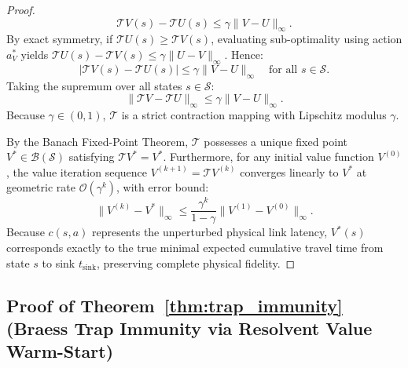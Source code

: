 \documentclass[11pt,a4paper]{article}
\begin{document}
\begin{proof}
\begin{equation}
\mathcal{T} V(s) - \mathcal{T} U(s) \le \gamma \|V - U\|_\infty.
\end{equation}
By exact symmetry, if $\mathcal{T} U(s) \ge \mathcal{T} V(s)$, evaluating sub-optimality using action $a_V^*$ yields $\mathcal{T} U(s) - \mathcal{T} V(s) \le \gamma \|U - V\|_\infty$. Hence:
\begin{equation}
\left| \mathcal{T} V(s) - \mathcal{T} U(s) \right| \le \gamma \|V - U\|_\infty \quad \text{for all } s \in \mathcal{S}.
\end{equation}
Taking the supremum over all states $s \in \mathcal{S}$:
\begin{equation}
\|\mathcal{T} V - \mathcal{T} U\|_\infty \le \gamma \|V - U\|_\infty.
\end{equation}
Because $\gamma \in (0, 1)$, $\mathcal{T}$ is a strict contraction mapping with Lipschitz modulus $\gamma$.

By the Banach Fixed-Point Theorem, $\mathcal{T}$ possesses a unique fixed point $V^* \in \mathcal{B}(\mathcal{S})$ satisfying $\mathcal{T} V^* = V^*$. Furthermore, for any initial value function $V^{(0)}$, the value iteration sequence $V^{(k+1)} = \mathcal{T} V^{(k)}$ converges linearly to $V^*$ at geometric rate $\mathcal{O}(\gamma^k)$, with error bound:
\begin{equation}
\|V^{(k)} - V^*\|_\infty \le \frac{\gamma^k}{1 - \gamma} \|V^{(1)} - V^{(0)}\|_\infty.
\end{equation}
Because $c(s, a)$ represents the unperturbed physical link latency, $V^*(s)$ corresponds exactly to the true minimal expected cumulative travel time from state $s$ to sink $t_{\text{sink}}$, preserving complete physical fidelity.
\end{proof}

\subsection{Proof of Theorem~\ref{thm:trap_immunity} (Braess Trap Immunity via Resolvent Value Warm-Start)}
\label{subsec:proof_thm3}
\end{document}
